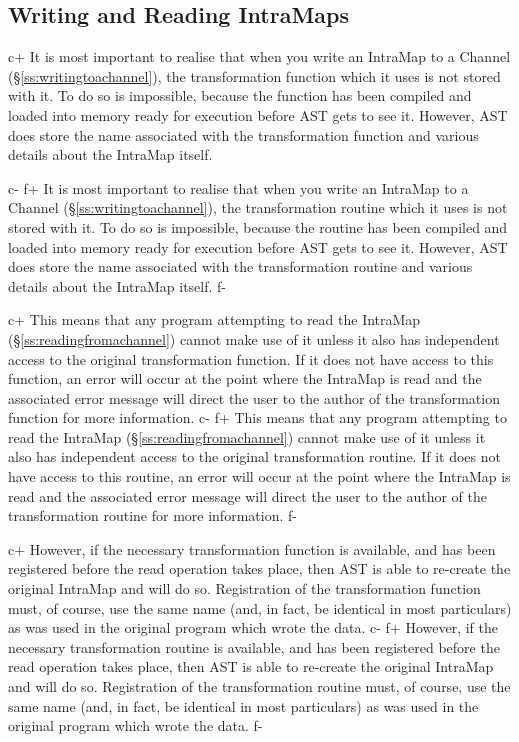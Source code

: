 \documentclass[twoside,11pt]{starlink}
\providecommand{\secref}[1]{\S\ref{#1}}
\begin{document}
\subsection{\label{ss:readingandwritingintramaps}Writing and Reading IntraMaps}

c+
It is most important to realise that when you write an IntraMap to a
Channel (\secref{ss:writingtoachannel}), the transformation function
which it uses is not stored with it. To do so is impossible, because
the function has been compiled and loaded into memory ready for
execution before AST gets to see it. However, AST does store the name
associated with the transformation function and various details about
the IntraMap itself.

c-
f+
It is most important to realise that when you write an IntraMap to a
Channel (\secref{ss:writingtoachannel}), the transformation routine
which it uses is not stored with it. To do so is impossible, because
the routine has been compiled and loaded into memory ready for
execution before AST gets to see it. However, AST does store the name
associated with the transformation routine and various details about
the IntraMap itself.
f-

c+
This means that any program attempting to read the IntraMap
(\secref{ss:readingfromachannel}) cannot make use of it unless it also
has independent access to the original transformation function. If it
does not have access to this function, an error will occur at the
point where the IntraMap is read and the associated error message will
direct the user to the author of the transformation function for more
information.
c-
f+
This means that any program attempting to read the IntraMap
(\secref{ss:readingfromachannel}) cannot make use of it unless it also
has independent access to the original transformation routine. If it
does not have access to this routine, an error will occur at the point
where the IntraMap is read and the associated error message will
direct the user to the author of the transformation routine for more
information.
f-

c+
However, if the necessary transformation function is available, and
has been registered before the read operation takes place, then AST is
able to re-create the original IntraMap and will do so. Registration
of the transformation function must, of course, use the same name
(and, in fact, be identical in most particulars) as was used in the
original program which wrote the data.
c-
f+
However, if the necessary transformation routine is available, and
has been registered before the read operation takes place, then AST is
able to re-create the original IntraMap and will do so. Registration
of the transformation routine must, of course, use the same name
(and, in fact, be identical in most particulars) as was used in the
original program which wrote the data.
f-
\end{document}
